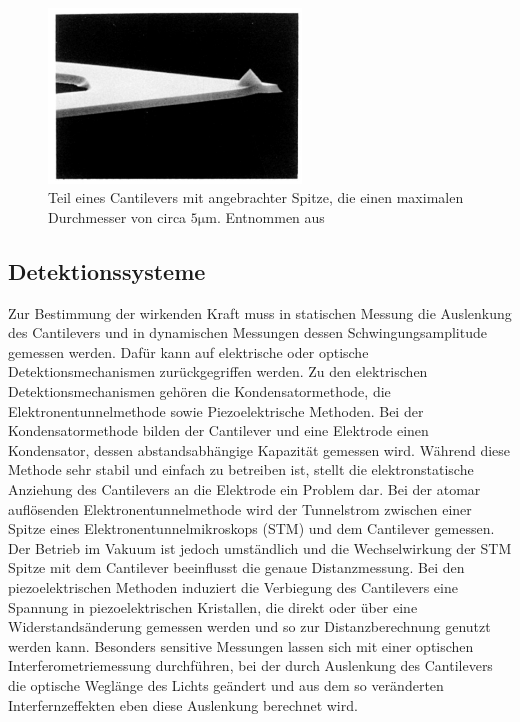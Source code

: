           \begin{figure}[h]
            \centering
            \includegraphics[width = 0.6\textwidth]{pictures/Cantilever_Spitze.png}
            \caption{Teil eines Cantilevers mit angebrachter Spitze, die einen maximalen Durchmesser von circa $5 \si{\micro\metre}$. Entnommen aus \cite{wiesendanger_scanning_1998}}
            \label{fig:Cantilever_Spitze}
          \end{figure}
        
          \FloatBarrier




      \newpage
      \subsection{Detektionssysteme}
          Zur Bestimmung der wirkenden Kraft muss in statischen Messung die Auslenkung des Cantilevers und in dynamischen Messungen dessen Schwingungsamplitude gemessen werden. Dafür kann auf elektrische
          oder optische Detektionsmechanismen zurückgegriffen werden. 
          Zu den elektrischen Detektionsmechanismen gehören die Kondensatormethode, die Elektronentunnelmethode sowie Piezoelektrische Methoden. Bei der Kondensatormethode bilden der Cantilever und eine
          Elektrode einen Kondensator, dessen abstandsabhängige Kapazität gemessen wird. Während diese Methode sehr stabil und einfach zu betreiben ist, stellt die elektronstatische Anziehung des Cantilevers
          an die Elektrode ein Problem dar. Bei der atomar auflösenden Elektronentunnelmethode wird der Tunnelstrom zwischen einer Spitze eines Elektronentunnelmikroskops (STM) und dem Cantilever gemessen. 
          Der Betrieb im Vakuum ist jedoch umständlich und die Wechselwirkung der STM Spitze mit dem Cantilever beeinflusst die genaue Distanzmessung. Bei den piezoelektrischen Methoden induziert die Verbiegung
          des Cantilevers eine Spannung in piezoelektrischen Kristallen, die direkt oder über eine Widerstandsänderung gemessen werden und so zur Distanzberechnung genutzt werden kann. 
          Besonders sensitive Messungen lassen sich mit einer optischen Interferometriemessung durchführen, bei der durch Auslenkung des Cantilevers die optische Weglänge des Lichts geändert und aus dem so
          veränderten Interfernzeffekten eben diese Auslenkung berechnet wird.


